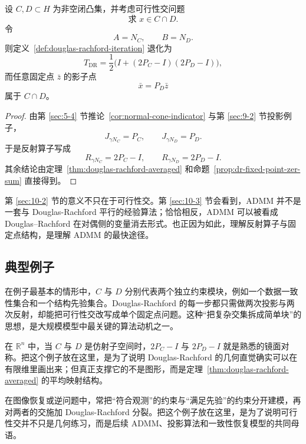 \begin{corollary}\label{cor:dr-feasibility-special-case}
设 $C,D\subset H$ 为非空闭凸集，并考虑可行性交问题
\[
\text{求 }x\in C\cap D.
\]
令
\[
A=N_C,\qquad B=N_D.
\]
则定义~\ref{def:douglas-rachford-iteration} 退化为
\[
T_{\mathrm{DR}}
=
\frac12\bigl(I+(2P_C-I)(2P_D-I)\bigr),
\]
而任意固定点 $\bar z$ 的影子点
\[
\bar x=P_D\bar z
\]
属于 $C\cap D$。
\end{corollary}

\begin{proof}
由第 \ref{sec:5-4} 节推论~\ref{cor:normal-cone-indicator} 与第 \ref{sec:9-2} 节投影例子，
\[
J_{\gamma N_C}=P_C,\qquad J_{\gamma N_D}=P_D.
\]
于是反射算子写成
\[
R_{\gamma N_C}=2P_C-I,\qquad R_{\gamma N_D}=2P_D-I.
\]
其余结论由定理~\ref{thm:douglas-rachford-averaged} 和命题~\ref{prop:dr-fixed-point-zer-sum} 直接得到。
\end{proof}

\begin{remark}
第 \ref{sec:10-2} 节的意义不只在于可行性交。第 \ref{sec:10-3} 节会看到，ADMM 并不是一套与 Douglas-Rachford 平行的经验算法；恰恰相反，ADMM 可以被看成 Douglas--Rachford 在对偶侧的变量消去形式。也正因为如此，理解反射算子与固定点结构，是理解 ADMM 的最快途径。
\end{remark}

\subsection{典型例子}

\begin{example}[两个闭凸集的可行性交]
在例子最基本的情形中，$C$ 与 $D$ 分别代表两个独立约束模块，例如一个数据一致性集合和一个结构先验集合。Douglas-Rachford 的每一步都只需做两次投影与两次反射，却能把可行性交改写成单个固定点问题。这种“把复杂交集拆成简单块”的思想，是大规模模型中最关键的算法动机之一。
\end{example}

\begin{example}[欧氏空间中的双反射]
在 $\mathbb R^n$ 中，当 $C$ 与 $D$ 是仿射子空间时，$2P_C-I$ 与 $2P_D-I$ 就是熟悉的镜面对称。把这个例子放在这里，是为了说明 Douglas-Rachford 的几何直觉确实可以在有限维里画出来；但真正支撑它的不是图形，而是定理~\ref{thm:douglas-rachford-averaged} 的平均映射结构。
\end{example}

\begin{example}[图像恢复中的一致性约束]
在图像恢复或逆问题中，常把“符合观测”的约束与“满足先验”的约束分开建模，再对两者的交施加 Douglas-Rachford 分裂。把这个例子放在这里，是为了说明可行性交并不只是几何练习，而是后续 ADMM、投影算法和一致性恢复模型的共同母语。
\end{example}

